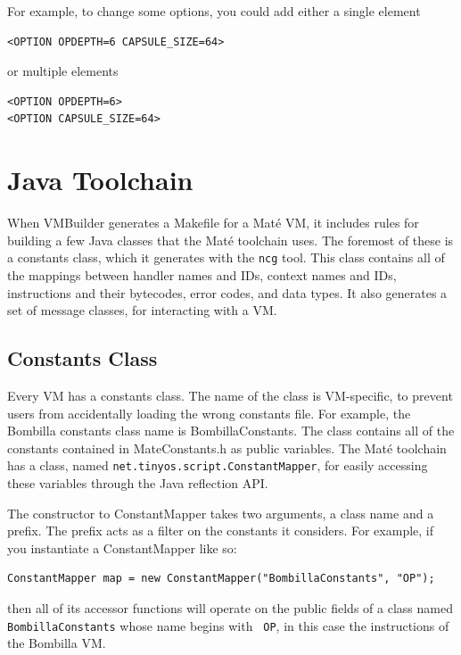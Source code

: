 \documentclass[12pt]{article}
\newcommand{\mate}{Mat\'{e}\xspace}
\begin{document}
For example, to change some options, you could add either a single element

\begin{verbatim}
<OPTION OPDEPTH=6 CAPSULE_SIZE=64>
\end{verbatim}

or multiple elements

\begin{verbatim}
<OPTION OPDEPTH=6>
<OPTION CAPSULE_SIZE=64>
\end{verbatim}



\section{Java Toolchain}

When VMBuilder generates a Makefile for a \mate VM, it includes rules
for building a few Java classes that the \mate toolchain uses. The
foremost of these is a constants class, which it generates with the
{\tt ncg} tool. This class contains all of the mappings between
handler names and IDs, context names and IDs, instructions and their
bytecodes, error codes, and data types. It also generates a set of
message classes, for interacting with a VM.

\subsection{Constants Class}

Every VM has a constants class. The name of the class is VM-specific,
to prevent users from accidentally loading the wrong constants
file. For example, the Bombilla constants class name is
BombillaConstants. The class contains all of the constants contained
in MateConstants.h as public variables. The \mate toolchain has a
class, named {\tt net.tinyos.script.ConstantMapper}, for easily
accessing these variables through the Java reflection API.

The constructor to ConstantMapper takes two arguments, a class name
and a prefix. The prefix acts as a filter on the constants it
considers. For example, if you instantiate a ConstantMapper like so:

\begin{verbatim}
ConstantMapper map = new ConstantMapper("BombillaConstants", "OP");
\end{verbatim}

then all of its accessor functions will operate on the public fields
of a class named {\tt BombillaConstants} whose name begins with {\tt
OP}, in this case the instructions of the Bombilla VM.
\end{document}
